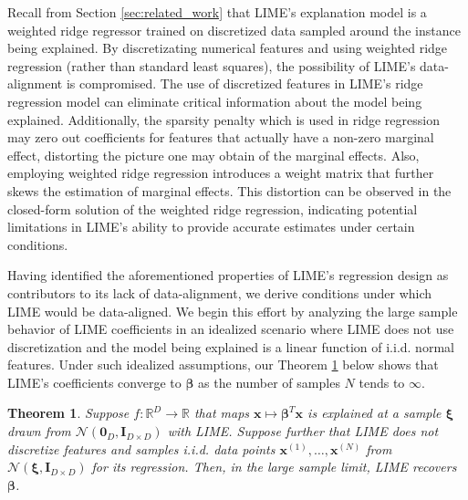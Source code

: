 \documentclass[12pt]{article}  %
\newcommand{\bI}{\mathbf{I}}
\newtheorem{theorem}{Theorem}
\begin{document}
             Recall from Section \ref{sec:related_work} that LIME's explanation model is a weighted ridge regressor trained on discretized data sampled around the instance being explained. By discretizating numerical features and using weighted ridge regression (rather than standard least squares), the possibility of LIME's data-alignment is compromised. The use of discretized features in LIME's ridge regression model can eliminate critical information about the model being explained. Additionally, the sparsity penalty which is used in ridge regression may zero out coefficients for features that actually have a non-zero marginal effect, distorting the picture one may obtain of the marginal effects. Also, employing weighted ridge regression introduces a weight matrix that further skews the estimation of marginal effects. This distortion can be observed in the closed-form solution of the weighted ridge regression, indicating potential limitations in LIME's ability to provide accurate estimates under certain conditions.
             
              Having identified the aforementioned properties of LIME's regression design as contributors to its lack of data-alignment, we derive conditions under which LIME would be data-aligned. We begin this effort by analyzing the large sample behavior of LIME coefficients in an idealized scenario where LIME does not use discretization and the model being explained is a linear function of i.i.d. normal features. Under such idealized assumptions, our Theorem \ref{thm:lime_thm} below shows that LIME's coefficients converge to $\boldsymbol{\beta}$ as the number of samples $N$ tends to $\infty$. %
            \begin{theorem}
                \label{thm:lime_thm}
                Suppose $f:\mathbb{R}^D\rightarrow \mathbb{R}$ that maps $\mathbf{x} \mapsto \boldsymbol{\beta}^T \mathbf{x}$ is explained at a sample $\boldsymbol{\xi}$ drawn from $\mathcal{N}(\mathbf{0}_D, \bI_{D\times D})$ with LIME. Suppose further that LIME does not discretize features and samples i.i.d. data points $\mathbf{x}^{(1)},\ldots,\mathbf{x}^{(N)}$ from $ \mathcal{N}(\boldsymbol{\xi}, \bI_{D\times D})$ for its regression.
                 Then, in the large sample limit, LIME recovers $\boldsymbol{\beta}$.  
            \end{theorem}
\end{document}
